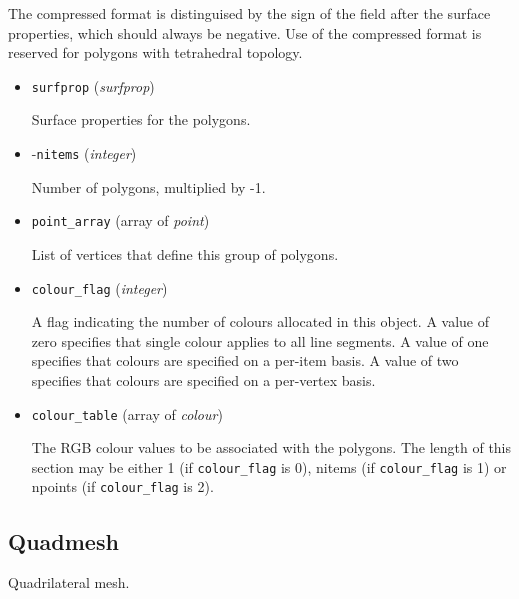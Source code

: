 \documentclass{article}
\newcommand{\kw}[1]{{\tt \mbox{#1}}}
\begin{document}
The compressed format is distinguised by the sign of the field after the
surface properties, which should always be negative.  Use of the
compressed format is reserved for polygons with tetrahedral topology.

\begin{itemize}
\item \kw{surfprop} ({\it surfprop})

Surface properties for the polygons.

\item -\kw{nitems} ({\it integer})

Number of polygons, multiplied by -1.

\item \kw{point\_array} (array of {\it point})

List of vertices that define this group of polygons.

\item \kw{colour\_flag} ({\it integer})

A flag indicating the number of colours allocated in this object.  A
value of zero specifies that single colour applies to all line segments.
A value of one specifies that colours are specified on a per-item basis.
A value of two specifies that colours are specified on a per-vertex basis.

\item \kw{colour\_table} (array of {\it colour})

The RGB colour values to be associated with the polygons.  The
length of this section may be either 1 (if \kw{colour\_flag} is 0), nitems
(if \kw{colour\_flag} is 1) or npoints (if \kw{colour\_flag} is 2).

\end{itemize}

\subsection{Quadmesh}

Quadrilateral mesh.
\end{document}
